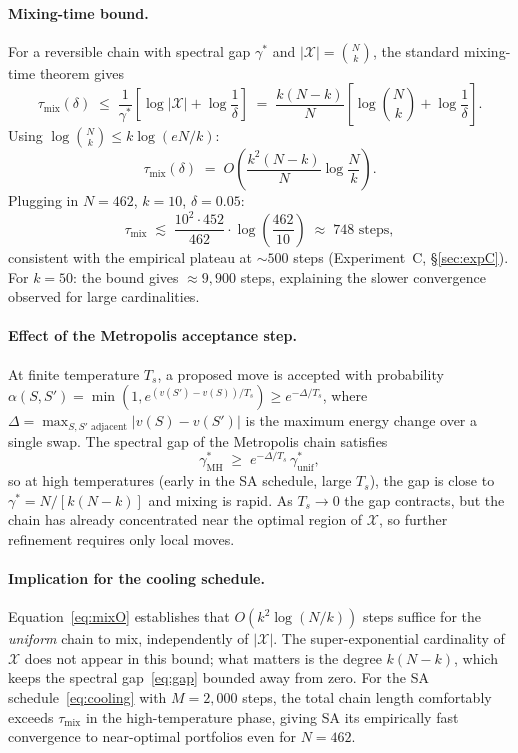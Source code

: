 \documentclass[11pt]{article}
\begin{document}
\paragraph{Mixing-time bound.}
For a reversible chain with spectral gap $\gamma^*$ and
$|\mathcal{X}|=\binom{N}{k}$, the standard mixing-time theorem
\cite{LevinPeres2017} gives
\begin{equation}
  \tau_{\mathrm{mix}}(\delta)
  \;\leq\;
  \frac{1}{\gamma^*}\!\left[\log|\mathcal{X}|+\log\frac{1}{\delta}\right]
  \;=\;
  \frac{k(N-k)}{N}
  \left[\log\binom{N}{k}+\log\frac{1}{\delta}\right].
  \label{eq:mixbound}
\end{equation}
Using $\log\binom{N}{k}\leq k\log(eN/k)$:
\begin{equation}
  \tau_{\mathrm{mix}}(\delta)
  \;=\;
  O\!\left(\frac{k^2(N-k)}{N}\log\frac{N}{k}\right).
  \label{eq:mixO}
\end{equation}
Plugging in $N=462$, $k=10$, $\delta=0.05$:
\[
  \tau_{\mathrm{mix}} \;\lesssim\;
  \frac{10^2\cdot 452}{462}\cdot\log\!\left(\frac{462}{10}\right)
  \;\approx\; 748\text{ steps},
\]
consistent with the empirical plateau at $\sim\!500$ steps
(Experiment~C, \S\ref{sec:expC}).
For $k=50$: the bound gives $\approx 9{,}900$ steps, explaining the
slower convergence observed for large cardinalities.

\paragraph{Effect of the Metropolis acceptance step.}
At finite temperature $T_s$, a proposed move is accepted with
probability $\alpha(S,S')=\min(1,e^{(v(S')-v(S))/T_s})\geq e^{-\Delta/T_s}$,
where $\Delta=\max_{S,S'\text{ adjacent}}|v(S)-v(S')|$ is the maximum
energy change over a single swap.
The spectral gap of the Metropolis chain satisfies \cite{LawlerSokal1988}
\begin{equation}
  \gamma^*_{\mathrm{MH}}
  \;\geq\;
  e^{-\Delta/T_s}\,\gamma^*_{\mathrm{unif}},
  \label{eq:mhgap}
\end{equation}
so at high temperatures (early in the SA schedule, large $T_s$),
the gap is close to $\gamma^*=N/[k(N-k)]$ and mixing is rapid.
As $T_s\to 0$ the gap contracts, but the chain has already
concentrated near the optimal region of $\mathcal{X}$, so further
refinement requires only local moves.

\paragraph{Implication for the cooling schedule.}
Equation~\eqref{eq:mixO} establishes that $O(k^2\log(N/k))$ steps
suffice for the \emph{uniform} chain to mix, independently of
$|\mathcal{X}|$.
The super-exponential cardinality of $\mathcal{X}$ does not appear in
this bound; what matters is the degree $k(N-k)$, which keeps the spectral
gap~\eqref{eq:gap} bounded away from zero.
For the SA schedule~\eqref{eq:cooling} with $M=2{,}000$ steps,
the total chain length comfortably exceeds $\tau_{\mathrm{mix}}$ in
the high-temperature phase, giving SA its empirically fast convergence
to near-optimal portfolios even for $N=462$.
\end{document}
